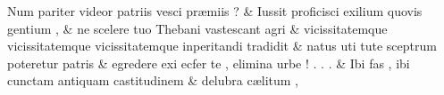 \documentclass[12pt,onecolumn,twoside,a4paper]{memoir}
\begin{document}
\begin{pairs}
\begin{Leftside}
                              Num
                              pariter
                              videor
                              patriis
                              vesci
                              præmiis
                              ? \&
                         \stanza {}Iussit
                              proficisci
                              exilium
                              quovis
                              gentium
                              , & 
                     ne
                              scelere
                              tuo
                              Thebani
                              vastescant
                              agri \&
                         \stanza {}
                     vicissitatemque
                              {vicissitatemque}
                              {vicissitatemque}
                              inperitandi
                              tradidit \&
                         \stanza {}
                     natus
                              uti
                              tute
                              sceptrum
                              poteretur
                              patris \&
                         \stanza {}
                     egredere
                              exi
                              ecfer
                              te
                              ,
                              elimina
                              urbe
                              !
                              .
                              .
                              . \&
                         \stanza {}
                     Ibi
                              fas
                              ,
                              ibi
                              cunctam
                              antiquam
                              castitudinem \&
                         \stanza {}
                     delubra
                              cælitum
                              ,

\end{Leftside}
\end{pairs}
\end{document}
